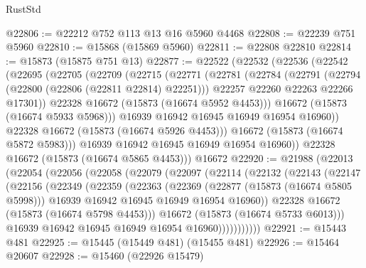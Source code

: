 \begin{lexlean}{RustStd}
\begin{coremodule}
@22806 := @22212 @752 @113 @13 @16 @5960 @4468
@22808 := @22239 @751 @5960
@22810 := @15868 (@15869 @5960)
@22811 := @22808 @22810
@22814 := @15873 (@15875 @751 @13)
@22877 := @22522
    (@22532
      (@22536
        (@22542
          (@22695
            (@22705
              (@22709
                (@22715
                  (@22771
                    (@22781
                      (@22784
                        (@22791
                          (@22794 (@22800 (@22806 (@22811 @22814) @22251)))
                          @22257
                          @22260
                          @22263
                          @22266
                          @17301))
                      @22328
                      @16672
                      (@15873 (@16674 @5952 @4453)))
                    @16672
                    (@15873 (@16674 @5933 @5968)))
                  @16939
                  @16942
                  @16945
                  @16949
                  @16954
                  @16960))
              @22328
              @16672
              (@15873 (@16674 @5926 @4453)))
            @16672
            (@15873 (@16674 @5872 @5983)))
          @16939
          @16942
          @16945
          @16949
          @16954
          @16960))
      @22328
      @16672
      (@15873 (@16674 @5865 @4453)))
    @16672
@22920 := @21988
    (@22013
      (@22054
        (@22056
          (@22058
            (@22079
              (@22097
                (@22114
                  (@22132
                    (@22143
                      (@22147
                        (@22156
                          (@22349
                            (@22359
                              (@22363
                                (@22369
                                  (@22877 (@15873 (@16674 @5805 @5998)))
                                  @16939
                                  @16942
                                  @16945
                                  @16949
                                  @16954
                                  @16960))
                              @22328
                              @16672
                              (@15873 (@16674 @5798 @4453)))
                            @16672
                            (@15873 (@16674 @5733 @6013)))
                          @16939
                          @16942
                          @16945
                          @16949
                          @16954
                          @16960)))))))))))
@22921 := @15443 @481
@22925 := @15445 (@15449 @481) (@15455 @481)
@22926 := @15464 @20607
@22928 := @15460 (@22926 @15479)

\end{coremodule}
\end{lexlean}
